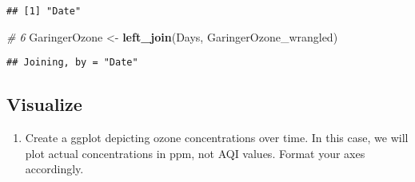 \documentclass[]{article}
\newenvironment{Shaded}{\begin{snugshade}}{\end{snugshade}}
\newcommand{\CommentTok}[1]{\textcolor[rgb]{0.56,0.35,0.01}{\textit{#1}}}
\newcommand{\DataTypeTok}[1]{\textcolor[rgb]{0.13,0.29,0.53}{#1}}
\newcommand{\DecValTok}[1]{\textcolor[rgb]{0.00,0.00,0.81}{#1}}
\newcommand{\FloatTok}[1]{\textcolor[rgb]{0.00,0.00,0.81}{#1}}
\newcommand{\KeywordTok}[1]{\textcolor[rgb]{0.13,0.29,0.53}{\textbf{#1}}}
\newcommand{\NormalTok}[1]{#1}
\newcommand{\OperatorTok}[1]{\textcolor[rgb]{0.81,0.36,0.00}{\textbf{#1}}}
\newcommand{\StringTok}[1]{\textcolor[rgb]{0.31,0.60,0.02}{#1}}
\providecommand{\tightlist}{%
  \setlength{\itemsep}{0pt}\setlength{\parskip}{0pt}}
\begin{document}
\begin{Shaded}
\end{Shaded}

\begin{verbatim}
## [1] "Date"
\end{verbatim}

\begin{Shaded}
\begin{Highlighting}[]
\CommentTok{# 6}
\NormalTok{GaringerOzone <-}\StringTok{ }\KeywordTok{left_join}\NormalTok{(Days, GaringerOzone_wrangled)}
\end{Highlighting}
\end{Shaded}

\begin{verbatim}
## Joining, by = "Date"
\end{verbatim}

\hypertarget{visualize}{%
\subsection{Visualize}\label{visualize}}

\begin{enumerate}
\def\labelenumi{\arabic{enumi}.}
\setcounter{enumi}{6}
\tightlist
\item
  Create a ggplot depicting ozone concentrations over time. In this
  case, we will plot actual concentrations in ppm, not AQI values.
  Format your axes accordingly.
\end{enumerate}
\end{document}
